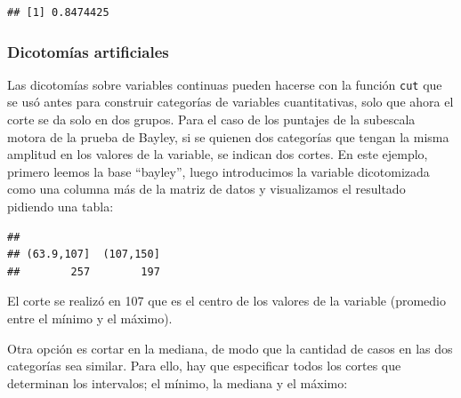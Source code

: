 \documentclass[]{book}
\newenvironment{Shaded}{\begin{snugshade}}{\end{snugshade}}
\newcommand{\DataTypeTok}[1]{\textcolor[rgb]{0.13,0.29,0.53}{#1}}
\newcommand{\DecValTok}[1]{\textcolor[rgb]{0.00,0.00,0.81}{#1}}
\newcommand{\FloatTok}[1]{\textcolor[rgb]{0.00,0.00,0.81}{#1}}
\newcommand{\KeywordTok}[1]{\textcolor[rgb]{0.13,0.29,0.53}{\textbf{#1}}}
\newcommand{\NormalTok}[1]{#1}
\newcommand{\OperatorTok}[1]{\textcolor[rgb]{0.81,0.36,0.00}{\textbf{#1}}}
\newcommand{\StringTok}[1]{\textcolor[rgb]{0.31,0.60,0.02}{#1}}
\begin{document}
\begin{verbatim}
## [1] 0.8474425
\end{verbatim}

\hypertarget{dicotomias-artificiales}{%
\subsubsection{Dicotomías artificiales}\label{dicotomias-artificiales}}

Las dicotomías sobre variables continuas pueden hacerse con la función \texttt{cut} que se usó antes para construir categorías de variables cuantitativas, solo que ahora el corte se da solo en dos grupos. Para el caso de los puntajes de la subescala motora de la prueba de Bayley, si se quienen dos categorías que tengan la misma amplitud en los valores de la variable, se indican dos cortes. En este ejemplo, primero leemos la base ``bayley'', luego introducimos la variable dicotomizada como una columna más de la matriz de datos y visualizamos el resultado pidiendo una tabla:

\begin{Shaded}
\end{Shaded}

\begin{verbatim}
## 
## (63.9,107]  (107,150] 
##        257        197
\end{verbatim}

El corte se realizó en 107 que es el centro de los valores de la variable (promedio entre el mínimo y el máximo).

Otra opción es cortar en la mediana, de modo que la cantidad de casos en las dos categorías sea similar. Para ello, hay que especificar todos los cortes que determinan los intervalos; el mínimo, la mediana y el máximo:

\begin{Shaded}
\end{Shaded}
\end{document}

